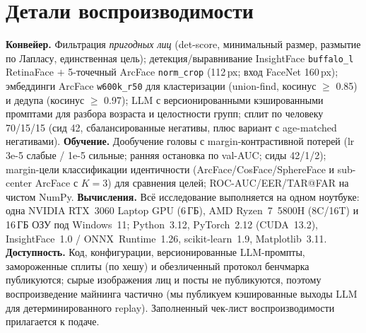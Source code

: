 \documentclass[10pt,twocolumn,letterpaper]{article}
\begin{document}
\section{Детали воспроизводимости}\label{sup:repro}
\textbf{Конвейер.} Фильтрация \emph{пригодных лиц} (det-score, минимальный размер, размытие по Лапласу,
единственная цель); детекция/выравнивание InsightFace \texttt{buffalo\_l} RetinaFace $+$ 5-точечный
ArcFace \texttt{norm\_crop} (112\,px; вход FaceNet 160\,px); эмбеддинги ArcFace \texttt{w600k\_r50} для
кластеризации (union-find, косинус $\geq$ 0.85) и дедупа (косинус $\geq$ 0.97); LLM с версионированными
кэшированными промптами для разбора возраста и целостности групп; сплит по человеку 70/15/15 (сид 42,
сбалансированные негативы, плюс вариант с age-matched негативами). \textbf{Обучение.} Дообучение головы
с margin-контрастивной потерей (lr 3e-5 слабые / 1e-5 сильные; ранняя остановка по val-AUC; сиды 42/1/2);
margin-цели классификации идентичности (ArcFace/CosFace/SphereFace и sub-center ArcFace с $K{=}3$) для
сравнения целей; ROC-AUC/EER/TAR@FAR на чистом NumPy. \textbf{Вычисления.} Всё исследование выполняется
на одном ноутбуке: одна NVIDIA RTX~3060 Laptop GPU (6\,ГБ), AMD Ryzen~7~5800H (8C/16T) и 16\,ГБ ОЗУ под
Windows~11; Python~3.12, PyTorch~2.12 (CUDA~13.2), InsightFace~1.0 / ONNX~Runtime~1.26, scikit-learn~1.9,
Matplotlib~3.11. \textbf{Доступность.} Код, конфигурации, версионированные LLM-промпты, замороженные
сплиты (по хешу) и обезличенный протокол бенчмарка публикуются; сырые изображения лиц и посты не
публикуются, поэтому воспроизведение майнинга частично (мы публикуем кэшированные выходы LLM для
детерминированного replay). Заполненный чек-лист воспроизводимости прилагается к подаче.



\end{document}

